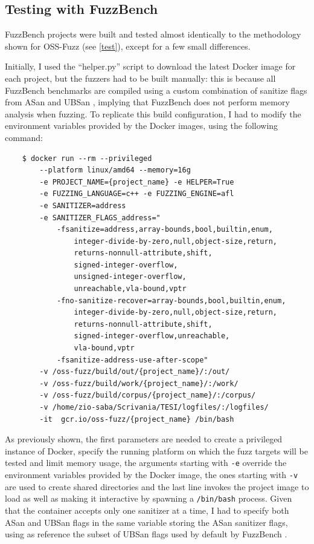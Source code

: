 \newpage
\subsection{Testing with FuzzBench}
FuzzBench projects were built and tested almost identically to the methodology shown for OSS-Fuzz (see \ref{test}), except for a few small differences.

Initially, I used the ``helper.py'' script to download the latest Docker image for each project, but the fuzzers had to be built manually: this is because all FuzzBench benchmarks are compiled using a custom combination of sanitize flags from ASan and UBSan \cite{flags}, implying that FuzzBench does not perform memory analysis when fuzzing. To replicate this build configuration, I had to modify the environment variables provided by the Docker images, using the following command:
\begin{verbatim}
    $ docker run --rm --privileged 
        --platform linux/amd64 --memory=16g 
        -e PROJECT_NAME={project_name} -e HELPER=True 
        -e FUZZING_LANGUAGE=c++ -e FUZZING_ENGINE=afl 
        -e SANITIZER=address 
        -e SANITIZER_FLAGS_address="
            -fsanitize=address,array-bounds,bool,builtin,enum,
                integer-divide-by-zero,null,object-size,return,
                returns-nonnull-attribute,shift,
                signed-integer-overflow,
                unsigned-integer-overflow,
                unreachable,vla-bound,vptr
            -fno-sanitize-recover=array-bounds,bool,builtin,enum,
                integer-divide-by-zero,null,object-size,return,
                returns-nonnull-attribute,shift,
                signed-integer-overflow,unreachable,
                vla-bound,vptr 
            -fsanitize-address-use-after-scope" 
        -v /oss-fuzz/build/out/{project_name}/:/out/  
        -v /oss-fuzz/build/work/{project_name}/:/work/
        -v /oss-fuzz/build/corpus/{project_name}/:/corpus/
        -v /home/zio-saba/Scrivania/TESI/logfiles/:/logfiles/  
        -it  gcr.io/oss-fuzz/{project_name} /bin/bash
\end{verbatim}
As previously shown, the first parameters are needed to create a privileged instance of Docker, specify the running platform on which the fuzz targets will be tested and limit memory usage, the arguments starting with \verb|-e| override the environment variables provided by the Docker image, the ones starting with \verb|-v| are used to create shared directories and the last line invokes the project image to load as well as making it interactive by spawning a \verb|/bin/bash| process.
Given that the container accepts only one sanitizer at a time, I had to specify both ASan and UBSan flags in the same variable storing the ASan sanitizer flags, using as reference the subset of UBSan flags used by default by FuzzBench \cite{flags}.

